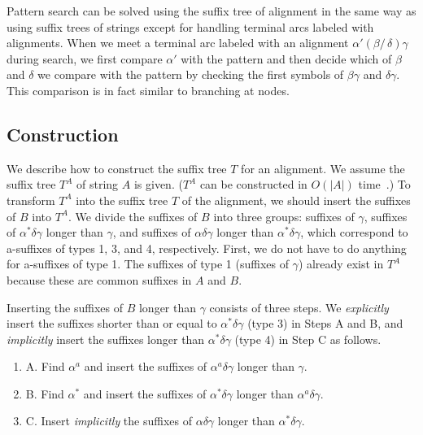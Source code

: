 \documentclass{llncs}
\newcommand{\partitle}[1]{}                        \newcommand{\commentout}[1]{}
\newcommand{\be}{\begin{enumerate}}
\newcommand{\ee}{\end{enumerate}}
\begin{document}
\partitle{pattern search}

Pattern search can be solved using the suffix tree of alignment
 in the same way as using suffix trees of strings
 except for handling terminal arcs labeled with alignments.
When we meet a terminal arc labeled with
 an alignment $\alpha' (\beta /\, \delta) \gamma$ during search,
 we first compare $\alpha'$ with the pattern
 and then decide which of $\beta$ and $\delta$ we compare with the pattern
 by checking the first symbols of $\beta \gamma$ and $\delta \gamma$.
This comparison is in fact similar to branching at nodes.




\subsection{Construction}
\label{subsec:const-simple}



\partitle{Intro}

We describe how to construct the suffix tree $T$ for an alignment.
We assume the suffix tree $T^A$ of string $A$ is given.
($T^A$ can be constructed in $O(|A|)$ time~\cite{McCreight:76,Ukkonen:95}.)
To transform $T^A$ into the suffix tree $T$ of the alignment,
 we should insert the suffixes of $B$ into $T^A$.
We divide the suffixes of $B$ into three groups:
 suffixes of $\gamma$, suffixes of $\alpha^{*}\delta \gamma$ longer than $\gamma$,
 and suffixes of $\alpha\delta\gamma$ longer than $\alpha^{*}\delta \gamma$,
 which correspond to a-suffixes of types 1, 3, and 4, respectively.
First, we do not have to do anything for a-suffixes of type 1.
The suffixes of type 1 (suffixes of $\gamma$)
 already exist in $T^A$
because these are common suffixes in $A$ and $B$.


\partitle{outline}

Inserting the suffixes of $B$ longer than $\gamma$ consists of three steps.
We {\em explicitly} insert the suffixes shorter than or equal to $\alpha^{*}\delta \gamma$
 (type 3) in Steps A and B,
 and {\em implicitly} insert the suffixes longer than $\alpha^{*}\delta \gamma$ (type 4) in Step C
 as follows.
\be
\item[A.] Find $\alpha^{a}$
         and insert the suffixes of $\alpha^{a}\delta \gamma$ longer than $\gamma$.
\item[B.] Find $\alpha^{*}$
         and insert the suffixes of $\alpha^{*} \delta \gamma$
             longer than $\alpha^{a}\delta \gamma$.
\item[C.] Insert {\em implicitly} the suffixes of $\alpha\delta\gamma$
         longer than $\alpha^{*}\delta \gamma$.
\ee
\end{document}
